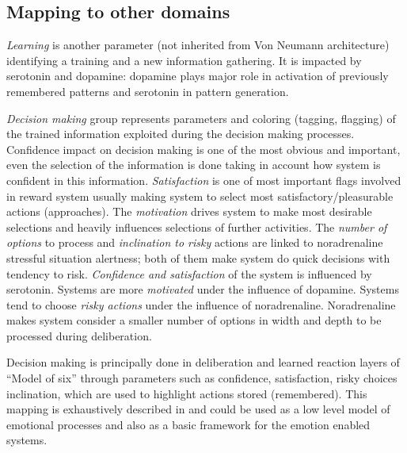 \documentclass[procedia]{easychair}
\begin{document}
\subsection{Mapping to other domains}

\textit{Learning} is another parameter (not inherited from Von Neumann architecture)
identifying a training and a new information gathering. It is impacted by serotonin and
dopamine: dopamine plays major role in activation of previously remembered patterns
and serotonin in pattern generation.

\textit{Decision making} group represents parameters
and coloring (tagging, flagging)
of the trained information exploited during the decision making processes. Confidence
impact on decision making is one of the most obvious and important, even the selection
of the information is done taking in account how system is confident in this information.
\textit{Satisfaction} is one of most important flags involved in reward system usually making
system to select most satisfactory/pleasurable actions (approaches). The \textit{motivation}
drives system to make most desirable selections and heavily influences selections
of further activities. The \textit{number of options} to process and \textit{inclination to risky}
actions are linked to noradrenaline stressful situation alertness; both of them
make system do quick decisions with tendency to risk. \textit{Confidence and satisfaction} of the system
is influenced by serotonin.
Systems are more \textit{motivated} under the influence of dopamine. Systems tend to choose
\textit{risky actions} under the influence of noradrenaline.
Noradrenaline makes system
consider a smaller number of options in width and depth to be processed during deliberation.


Decision making is principally done in deliberation and learned reaction layers
of ``Model of six'' \cite{minsky2007} through parameters such as confidence,
satisfaction, risky choices inclination, which are used to highlight actions
stored (remembered). This mapping is exhaustively described in
\cite{talanov2014} and could be used as a low level model of emotional processes
and also as a basic framework for the emotion enabled systems.
\end{document}
